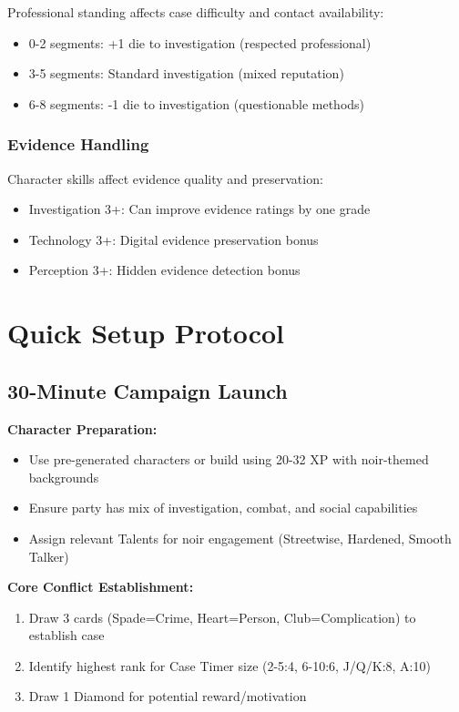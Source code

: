 \documentclass[11pt]{article}
\begin{document}
Professional standing affects case difficulty and contact availability:
\begin{itemize}
\item 0-2 segments: +1 die to investigation (respected professional)
\item 3-5 segments: Standard investigation (mixed reputation)
\item 6-8 segments: -1 die to investigation (questionable methods)
\end{itemize}

\subsubsection{Evidence Handling}

Character skills affect evidence quality and preservation:
\begin{itemize}
\item Investigation 3+: Can improve evidence ratings by one grade
\item Technology 3+: Digital evidence preservation bonus
\item Perception 3+: Hidden evidence detection bonus
\end{itemize}

\section{Quick Setup Protocol}

\subsection{30-Minute Campaign Launch}

\textbf{Character Preparation:}
\begin{itemize}
\item Use pre-generated characters or build using 20-32 XP with noir-themed backgrounds
\item Ensure party has mix of investigation, combat, and social capabilities
\item Assign relevant Talents for noir engagement (Streetwise, Hardened, Smooth Talker)
\end{itemize}

\textbf{Core Conflict Establishment:}
\begin{enumerate}
\item Draw 3 cards (Spade=Crime, Heart=Person, Club=Complication) to establish case
\item Identify highest rank for Case Timer size (2-5:4, 6-10:6, J/Q/K:8, A:10)
\item Draw 1 Diamond for potential reward/motivation
\end{enumerate}
\end{document}
